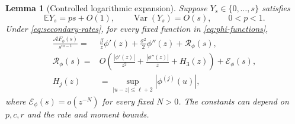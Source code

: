\documentclass[11pt,a4paper]{article}
\newtheorem{lemma}[theorem]{Lemma}
\theoremstyle{remark}\newtheorem{remark}[theorem]{Remark}
\DeclareMathOperator{\Var}{Var}
\newcommand{\E}{\mathbb E}
\newcommand{\A}{\mathcal A}
\begin{document}
\begin{lemma}[Controlled logarithmic expansion]\label{lem:log-expansion}
Suppose $Y_s\in\{0,\ldots,s\}$ satisfies
\begin{equation}\label{eq:moment-hypothesis}
\E Y_s=ps+O(1),\qquad \Var(Y_s)=O(s),\qquad 0<p<1.
\end{equation}
Under \eqref{eq:secondary-rates}, for every fixed function in \eqref{eq:phi-functions},
\begin{align}
\frac{\A F_\phi(s)}{s^{m-1}}
={}&\frac{\beta}{z}\phi'(z)+\frac{\sigma^2}{2}\phi''(z)
+\mathcal R_\phi(s),\label{eq:lamperti-expansion}\\
\mathcal R_\phi(s)
={}&O\!\left(\frac{|\phi'(z)|}{z^2}
       +\frac{|\phi''(z)|}{z}
       +H_3(z)\right)+\mathcal E_\phi(s),\label{eq:remainder}\\
H_j(z)&=\sup_{|u-z|\le\ell+2}|\phi^{(j)}(u)|,\nonumber
\end{align}
where $\mathcal E_\phi(s)=o(z^{-N})$ for every fixed $N>0$. The constants can depend on $p,c,r$ and the rate and moment bounds.
\end{lemma}
\end{document}
